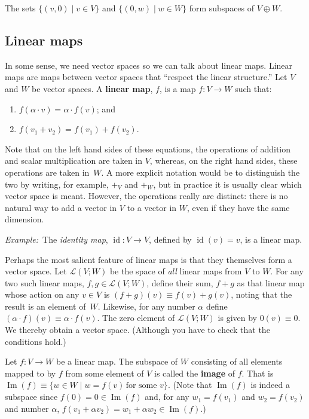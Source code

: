 \documentclass[10pt, a4paper, twocolumn]{article}
\newcommand{\defn}[1]{\textbf{#1}}
\newcommand{\eg}{\emph{Example:}\relax}
\DeclareMathOperator{\id}{id}
\DeclareMathOperator{\image}{Im}
\begin{document}
The sets $\{(v, 0) \mid v\in V\}$ and $\{(0, w) \mid w\in W\}$ form subspaces of
$V \oplus W$.

\subsection{Linear maps}

In some sense, we need vector spaces so we can talk about linear maps. Linear
maps are maps between vector spaces that “respect the linear structure.” Let $V$
and $W$ be vector spaces. A \defn{linear map}, $f$, is a map $f:V \to W$ such
that:
\begin{enumerate}
\item $f(\alpha\cdot v) = \alpha\cdot f(v)$; and
\item $f(v_1 + v_2) = f(v_1) + f(v_2)$.  
\end{enumerate}
Note that on the left hand sides of these equations, the operations of addition
and scalar multiplication are taken in $V$, whereas, on the right hand sides,
these operations are taken in~$W$. A more explicit notation would be to
distinguish the two by writing, for example, $+_V$ and $+_W$, but in practice it
is usually clear which vector space is meant. However, the operations really are
distinct: there is no natural way to add a vector in $V$ to a vector in $W$,
even if they have the same dimension.

\eg\ The \emph{identity map}, $\id : V \to V$, defined by $\id(v) = v$, is a
linear map.

Perhaps the most salient feature of linear maps is that they themselves form a
vector space. Let $\mathcal{L}(V; W)$ be the space of \emph{all} linear maps
from $V$ to $W$. For any two such linear maps, $f,g \in \mathcal{L}(V; W)$, define
their sum, $f + g$ as that linear map whose action on any $v \in V$ is $(f+g)(v) \equiv
f(v) + g(v)$, noting that the result is an element of~$W$. Likewise, for any
number $\alpha$ define $(\alpha \cdot f)(v) \equiv \alpha\cdot f(v)$. The zero element of $\mathcal{L}(V;
W)$ is given by $0(v) \equiv 0$. We thereby obtain a vector space. (Although you have
to check that the conditions hold.)

Let $f : V\to W$ be a linear map. The subspace of $W$ consisting of all elements
mapped to by $f$ from some element of $V$ is called the \defn{image} of
$f$. That is $\image(f) \equiv \{ w\in W\mid w = f(v)\,\text{for some $v$}\}$. (Note that
$\image(f)$ is indeed a subspace since $f(0) = 0 \in \image(f)$ and, for any $w_1
= f(v_1)$ and $w_2 = f(v_2)$ and number $\alpha$, $f(v_1 + \alpha v_2) = w_1 + \alpha w_2 \in
\image(f)$.)
\end{document}
